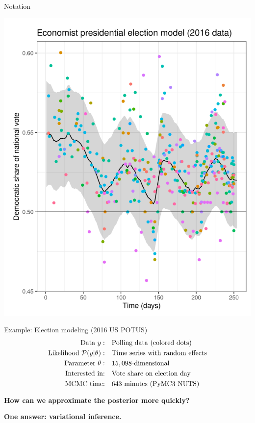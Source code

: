 \documentclass[8pt]{beamer}\usepackage[]{graphicx}\usepackage[]{color}
\begin{document}
\begin{frame}[t]{Notation}
\begin{minipage}{0.35\textwidth}
\includegraphics[width=\linewidth]{static_figures/election_data}
\end{minipage}
\begin{minipage}{0.63\textwidth}
    Example: Election modeling (2016 US POTUS)
    \begin{align*}
        \text{Data } y:&\quad \textrm{Polling data (colored dots)} \\
        \text{Likelihood } \mathcal{P}(y \vert \theta):&\quad \textrm{Time series with random effects}\\
        \text{Parameter }\theta:& \quad 15,098\textrm{-dimensional}\\
        \text{Interested in:}& \quad\textrm{Vote share on election day}\\
        \text{MCMC time:}& \quad 643 \textrm{ minutes (PyMC3 NUTS)}
    \end{align*}

    \textbf{How can we approximate the posterior more quickly?}

    \textbf{One answer: variational inference.}

\end{minipage}

\end{frame}
\end{document}
